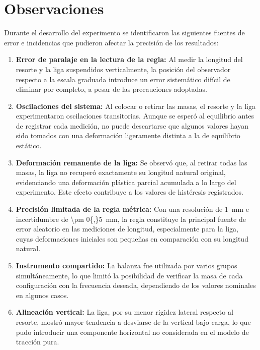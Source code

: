 
\section{Observaciones}

Durante el desarrollo del experimento se identificaron las siguientes
fuentes de error e incidencias que pudieron afectar la precisión de
los resultados:

\begin{enumerate}

    \item \textbf{Error de paralaje en la lectura de la regla:}
    Al medir la longitud del resorte y la liga suspendidos verticalmente,
    la posición del observador respecto a la escala graduada introduce
    un error sistemático difícil de eliminar por completo, a pesar de
    las precauciones adoptadas.

    \item \textbf{Oscilaciones del sistema:}
    Al colocar o retirar las masas, el resorte y la liga experimentaron
    oscilaciones transitorias. Aunque se esperó al equilibrio antes de
    registrar cada medición, no puede descartarse que algunos valores
    hayan sido tomados con una deformación ligeramente distinta a la
    de equilibrio estático.

    \item \textbf{Deformación remanente de la liga:}
    Se observó que, al retirar todas las masas, la liga no recuperó
    exactamente su longitud natural original, evidenciando una
    deformación plástica parcial acumulada a lo largo del experimento.
    Este efecto contribuye a los valores de histéresis registrados.

    \item \textbf{Precisión limitada de la regla métrica:}
    Con una resolución de \qty{1}{mm} e incertidumbre de
    \qty{\pm 0{,}5}{mm}, la regla constituye la principal fuente de
    error aleatorio en las mediciones de longitud, especialmente para
    la liga, cuyas deformaciones iniciales son pequeñas en comparación con su longitud natural.

    \item \textbf{Instrumento compartido:}
    La balanza fue utilizada por varios grupos simultáneamente, lo que
    limitó la posibilidad de verificar la masa de cada configuración
    con la frecuencia deseada, dependiendo de los valores nominales en algunos casos.

    \item \textbf{Alineación vertical:}
    La liga, por su menor rigidez lateral respecto al resorte, mostró
    mayor tendencia a desviarse de la vertical bajo carga, lo que pudo
    introducir una componente horizontal no considerada en el modelo de tracción pura.

\end{enumerate}

